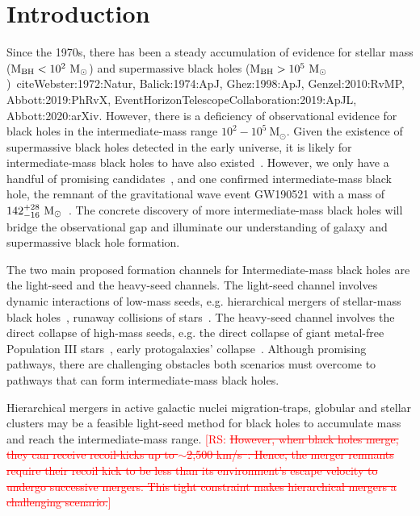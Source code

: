 \documentclass[%
 nofootinbib,
 amsmath,amssymb,
 aps,
 twocolumn
]{revtex4-2}
\newcommand{\mathcmd}[1]{{\sc \relax\ifmmode#1\else $#1$\fi}\xspace}
\newcommand{\msun}{\mathcmd{\text{M}_\odot}}
\newcommand{\rs}[1]{\textcolor{red}{[RS: #1]}}
\begin{document}
\section{Introduction}
Since the 1970s, there has been a steady accumulation of evidence for stellar mass ($\text{M}_\text{BH} < 10^{2} \ \msun$) and supermassive black holes ($\text{M}_\text{BH} > 10^{5} \ \msun$)~cite{Webster:1972:Natur, Balick:1974:ApJ, Ghez:1998:ApJ, Genzel:2010:RvMP, Abbott:2019:PhRvX, EventHorizonTelescopeCollaboration:2019:ApJL, Abbott:2020:arXiv}. However, there is a deficiency of observational evidence for black holes in the intermediate-mass range $10^{2} - 10^{5}\ \text{M}_{\odot}$. Given the existence of supermassive black holes detected in the early universe, it is likely for intermediate-mass black holes to have also existed~\cite{Banados:2018:Natur}. However, we only have a handful of promising candidates~\cite{Greene:2004:ApJ, Graham:2013:ApJ, Mezcua:2017:IJMPD, Koliopanos:2017:mbhe, Lin:2020:ApJL, Greene:2020:ARA&A}, and one confirmed intermediate-mass black hole, the remnant of the gravitational wave event GW190521 with a mass of $142^{+28}_{-16}\ \msun$~\cite{Abbott:2020:PhRvL}. The concrete discovery of more intermediate-mass black holes will bridge the observational gap and illuminate our understanding of galaxy and supermassive black hole formation. 

The two main proposed formation channels for Intermediate-mass black holes are the light-seed and the heavy-seed channels. The light-seed channel involves dynamic interactions of low-mass seeds, e.g. hierarchical mergers of stellar-mass black holes~\cite{}, runaway collisions of stars~\cite{}.  The heavy-seed channel involves the direct collapse of high-mass seeds, e.g. the direct collapse of giant metal-free Population III stars~\cite{}, early protogalaxies' collapse~\cite{}.  Although promising pathways, there are challenging obstacles both scenarios must overcome to pathways that can form intermediate-mass black holes. 

Hierarchical mergers in active galactic nuclei migration-traps, globular and stellar clusters may be a feasible light-seed method for black holes to accumulate mass and reach the intermediate-mass range. \rs{\sout{However, when black holes merge, they can receive recoil-kicks up to $\sim$2,500 km/s~\cite{}. Hence, the merger remnants require their recoil kick to be less than its environment's escape velocity to undergo successive mergers. This tight constraint makes hierarchical mergers a challenging scenario.}} 
\end{document}
